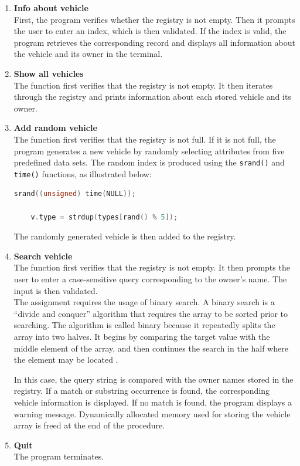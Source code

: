 \documentclass[12pt, a4paper]{article}
\begin{document}
\begin{enumerate}
  \item \textbf{Info about vehicle} \\
  First, the program verifies whether the registry is not empty. Then it prompts the user to enter an index, which is then validated. If the index is valid, the program retrieves the corresponding record and displays all information about the vehicle and its owner in the terminal.

  \item \textbf{Show all vehicles} \\

The function first verifies that the registry is not empty. It then iterates through the registry and prints information about each stored vehicle and its owner. 

  \item \textbf{Add random vehicle} \\

The function first verifies that the registry is not full. If it is not full, the program generates a new vehicle by randomly selecting attributes from five predefined data sets. 
The random index is produced using the \texttt{srand()} and \texttt{time()} functions, as illustrated below:

    \begin{lstlisting}[language=C, caption={Random selection}]
    srand((unsigned) time(NULL));

    v.type = strdup(types[rand() % 5]);
    \end{lstlisting}

    The randomly generated vehicle is then added to the registry.

  \item \textbf{Search vehicle} \\

    The function first verifies that the registry is not empty. It then prompts the user to enter a case-sensitive query corresponding to the owner’s name. The input is then validated. \\
    
    The assignment requires the usage of binary search. A binary search is a ``divide and conquer'' algorithm that requires the array to be sorted prior to searching. The algorithm is called binary because it repeatedly splits the array into two halves. It begins by comparing the target value with the middle element of the array, and then continues the search in the half where the element may be located \cite{bbc_binarysearch}.

    In this case, the query string is compared with the owner names stored in the registry. If a match or substring occurrence is found, the corresponding vehicle information is displayed. If no match is found, the program displays a warning message. 
    Dynamically allocated memory used for storing the vehicle array is freed at the end of the procedure.

  \item \textbf{Quit} \\
  The program terminates.
\end{enumerate}
\end{document}
